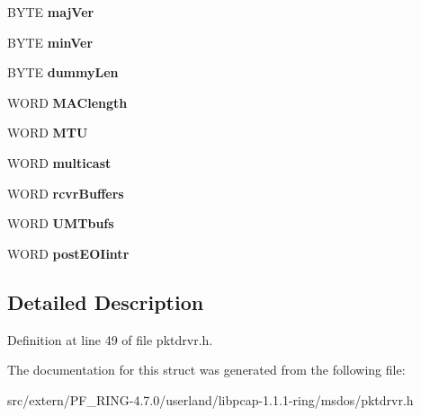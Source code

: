 \begin{DoxyCompactItemize}
\item 
\hypertarget{struct_p_k_t___i_n_f_o_adc8b1c11c0997d8909172cb18a1685ae}{
BYTE {\bfseries majVer}}
\label{struct_p_k_t___i_n_f_o_adc8b1c11c0997d8909172cb18a1685ae}

\item 
\hypertarget{struct_p_k_t___i_n_f_o_ad2587694f26d03c8b4620d6225856710}{
BYTE {\bfseries minVer}}
\label{struct_p_k_t___i_n_f_o_ad2587694f26d03c8b4620d6225856710}

\item 
\hypertarget{struct_p_k_t___i_n_f_o_a99220d446bc2f89d65926e5c355ea350}{
BYTE {\bfseries dummyLen}}
\label{struct_p_k_t___i_n_f_o_a99220d446bc2f89d65926e5c355ea350}

\item 
\hypertarget{struct_p_k_t___i_n_f_o_aa9eaca77f9874d898d44db67f8db7bcc}{
WORD {\bfseries MAClength}}
\label{struct_p_k_t___i_n_f_o_aa9eaca77f9874d898d44db67f8db7bcc}

\item 
\hypertarget{struct_p_k_t___i_n_f_o_a246b9e56b1b249170bf4b029da1dcf29}{
WORD {\bfseries MTU}}
\label{struct_p_k_t___i_n_f_o_a246b9e56b1b249170bf4b029da1dcf29}

\item 
\hypertarget{struct_p_k_t___i_n_f_o_af4c40bf78d0a937e6dc0fa8576f189f1}{
WORD {\bfseries multicast}}
\label{struct_p_k_t___i_n_f_o_af4c40bf78d0a937e6dc0fa8576f189f1}

\item 
\hypertarget{struct_p_k_t___i_n_f_o_a55c22e2d4b9bff4e23a578363cf2de3e}{
WORD {\bfseries rcvrBuffers}}
\label{struct_p_k_t___i_n_f_o_a55c22e2d4b9bff4e23a578363cf2de3e}

\item 
\hypertarget{struct_p_k_t___i_n_f_o_ae309245e52f27adc0398d1447e1d53b9}{
WORD {\bfseries UMTbufs}}
\label{struct_p_k_t___i_n_f_o_ae309245e52f27adc0398d1447e1d53b9}

\item 
\hypertarget{struct_p_k_t___i_n_f_o_aeaf35f46d1aeefb8806ca0a963e4b24a}{
WORD {\bfseries postEOIintr}}
\label{struct_p_k_t___i_n_f_o_aeaf35f46d1aeefb8806ca0a963e4b24a}

\end{DoxyCompactItemize}


\subsection{Detailed Description}


Definition at line 49 of file pktdrvr.h.



The documentation for this struct was generated from the following file:\begin{DoxyCompactItemize}
\item 
src/extern/PF\_\-RING-\/4.7.0/userland/libpcap-\/1.1.1-\/ring/msdos/pktdrvr.h\end{DoxyCompactItemize}
